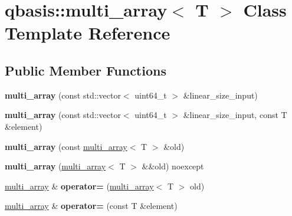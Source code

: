 \hypertarget{classqbasis_1_1multi__array}{}\section{qbasis\+:\+:multi\+\_\+array$<$ T $>$ Class Template Reference}
\label{classqbasis_1_1multi__array}
\subsection*{Public Member Functions}
\begin{DoxyCompactItemize}
\item 
\mbox{\label{classqbasis_1_1multi__array_adb8509d40315a1ae65f47de7112b2cf3}} 
{\bfseries multi\+\_\+array} (const std\+::vector$<$ uint64\+\_\+t $>$ \&linear\+\_\+size\+\_\+input)
\item 
\mbox{\label{classqbasis_1_1multi__array_a6a95295cbab9d5a65bc62a37456b7585}} 
{\bfseries multi\+\_\+array} (const std\+::vector$<$ uint64\+\_\+t $>$ \&linear\+\_\+size\+\_\+input, const T \&element)
\item 
\mbox{\label{classqbasis_1_1multi__array_a67c90dd822c714179dbc4df8bcb035f4}} 
{\bfseries multi\+\_\+array} (const \hyperlink{classqbasis_1_1multi__array}{multi\+\_\+array}$<$ T $>$ \&old)
\item 
\mbox{\label{classqbasis_1_1multi__array_af46fc35268484faf4d63b296f5ab0edd}} 
{\bfseries multi\+\_\+array} (\hyperlink{classqbasis_1_1multi__array}{multi\+\_\+array}$<$ T $>$ \&\&old) noexcept
\item 
\mbox{\label{classqbasis_1_1multi__array_adf866084daabc28d44d9820b689571f7}} 
\hyperlink{classqbasis_1_1multi__array}{multi\+\_\+array} \& {\bfseries operator=} (\hyperlink{classqbasis_1_1multi__array}{multi\+\_\+array}$<$ T $>$ old)
\item 
\mbox{\label{classqbasis_1_1multi__array_ab3d8d785c53a43a253e0d977da90457e}} 
\hyperlink{classqbasis_1_1multi__array}{multi\+\_\+array} \& {\bfseries operator=} (const T \&element)
\item 

\end{DoxyCompactItemize}
